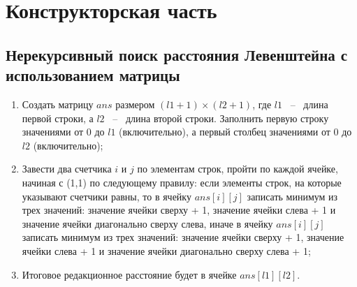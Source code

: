 \documentclass[12pt, a4paper]{article}
\begin{document}
\section{Конструкторская часть}
\subsection{Нерекурсивный поиск расстояния 
Левенштейна с использованием матрицы}
\begin{enumerate}
	\item Создать матрицу $ans$ размером $(l1+1) 
	\times (l2+1)$, где $l1$ ~--~ длина первой 
	строки, а $l2$ ~--~ длина второй строки. 
	Заполнить первую строку значениями от 0 до $l1$ 
	(включительно), а первый столбец значениями от 0 
	до $l2$ (включительно);
	\item Завести два счетчика $i$ и $j$ по 
	элементам строк, пройти по каждой ячейке, начиная 
	с (1,1) по следующему правилу: если элементы 
	строк, на которые указывают счетчики равны, то в 
	ячейку $ans[i][j]$ записать минимум из трех 
	значений: значение ячейки сверху + 1, значение 
	ячейки слева + 1 и значение ячейки диагонально 
	сверху слева, иначе в ячейку $ans[i][j]$ записать 
	минимум из трех значений: значение ячейки сверху 
	+ 1, значение ячейки слева + 1 и значение ячейки
	диагонально сверху слева + 1;
	\item Итоговое редакционное расстояние будет в ячейке $ans[l1][l2]$.
\end{enumerate}
\end{document}
